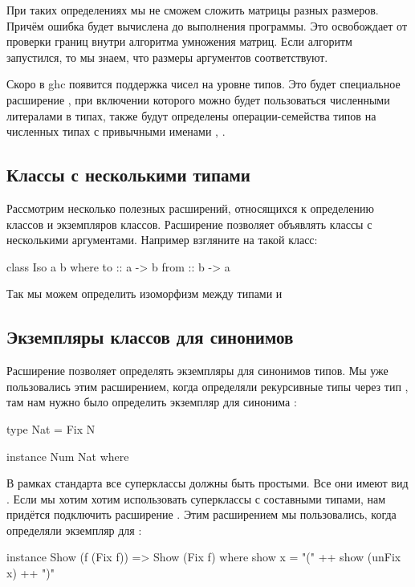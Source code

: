 При таких определениях мы не сможем сложить матрицы разных размеров.
Причём ошибка будет вычислена до выполнения программы. Это освобождает
от проверки границ внутри алгоритма умножения матриц. Если алгоритм
запустился, то мы знаем, что размеры аргументов соответствуют.

Скоро в ghc появится поддержка чисел на уровне типов. Это будет
специальное расширение , при включении которого можно
будет пользоваться численными литералами в типах, также будут определены
операции-семейства типов на численных типах с привычными именами \In{+},
\In{*}.

\subsection{Классы с несколькими типами}

Рассмотрим несколько полезных расширений, относящихся к определению
классов и экземпляров классов. Расширение 
позволяет объявлять классы с несколькими аргументами. Например взгляните
на такой класс:


\begin{code}
class Iso a b where
    to      :: a -> b
    from    :: b -> a
\end{code}

Так мы можем определить изоморфизм между типами  и 

\subsection{Экземпляры классов для синонимов}

Расширение  позволяет определять экземпляры для
синонимов типов. Мы уже пользовались этим расширением, когда определяли
рекурсивные типы через тип , там нам нужно было определить
экземпляр  для синонима :


\begin{code}
type Nat = Fix N

instance Num Nat where
\end{code}

В рамках стандарта все суперклассы должны быть простыми. Все они имеют
вид . Если мы хотим хотим использовать суперклассы с составными
типами, нам придётся подключить расширение . Этим
расширением мы пользовались, когда определяли экземпляр  для
:


\begin{code}
instance Show (f (Fix f)) => Show (Fix f) where
    show x = "(" ++ show (unFix x) ++ ")"
\end{code}

